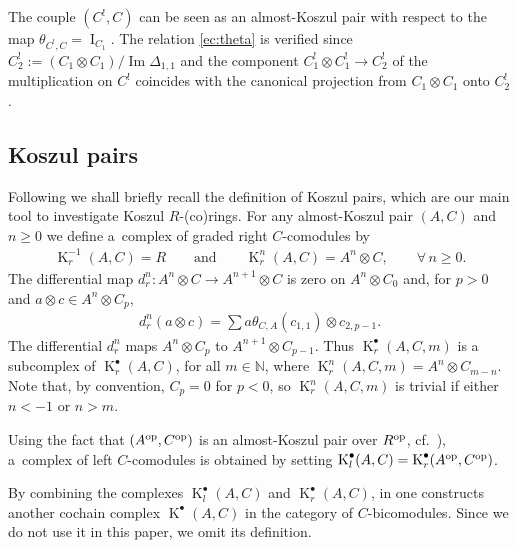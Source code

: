 \documentclass[11pt]{article}
\def\Id{\operatorname{I}}
\DeclareMathOperator{\im}{Im}
\DeclareMathOperator{\K}{K}
\newcommand\ot{\otimes}
\renewcommand{\^}[1]{\mbox{$^{\left( #1 \right)}$}}
\renewcommand{\_}[1]{\mbox{$_{\left( #1 \right)}$}}
\newcommand{\N}{{\mathbb N}}
\numberwithin{equation}{section}
\begin{document}
The couple $(C^!,C)$ can be seen as an almost-Koszul pair with respect to the map $\theta_{C^!,C}=\Id_{ C_1}$. The relation \eqref{ec:theta} is verif\/ied since $C^!_2:=(C_1\ot C_1)/\im\Delta_{1,1}$ and the component $C_1^!\ot C_1^!\to C^!_2$ of the multiplication on $C^!$ coincides with the canonical projection from $C_1\ot C_1$ onto $C^!_2$.

\subsection{Koszul pairs} \label{fa:Koszul pairs}
Following \cite{jps} we shall brief\/ly recall the def\/inition of Koszul pairs, which are our main tool to investigate Koszul $R$-(co)rings. For any almost-Koszul pair $(A,C)$ and $n\geq 0$ we def\/ine a~complex of graded right $C$-comodules by
\begin{gather*} \operatorname{K}_r^{-1}(A,C)=R \qquad \text{and} \qquad \operatorname{K}^n_r(A,C)=A^n \otimes C, \qquad \forall\, n \geq 0.\end{gather*}
The dif\/ferential map $d_{r}^{n}\colon A^{n}\otimes C\rightarrow A^{n+1}\otimes C$ is zero on $A^{n}\otimes C_{0}$ and, for $p>0$ and $a\otimes c\in A^{n}\otimes C_{p},$
\begin{gather*}
 d_{r}^{n}(a\otimes c)=\sum\limits a\theta _{C,A}(c_{1,{1}})\otimes c_{2,{p-1}}.
\end{gather*}
The dif\/ferential $d^n_r$ maps $A^{n}\ot C_{p}$ to $A^{n+1}\ot C_{p-1}$. Thus $\K^\bullet_r(A,C,m)$ is a subcomplex of $\K^\bullet_r(A,C)$, for all $m\in\N$, where $\K^n_r(A,C,m)= A^{n}\ot C_{m-n}$. Note that, by convention, $C_p=0$ for $p<0$, so $\K^n_r(A,C,m)$ is trivial if either $n<-1$ or $n>m$.

Using the fact that $(A^{\rm op},C^{\rm op})$ is an almost-Koszul pair over $R^{\rm op}$, cf.\ \cite[Remark~1.4]{jps}), a~complex of left $C$-comodules is obtained by setting $\operatorname{K}_l^\bullet(A,C)=\operatorname{K}_r^\bullet(A^{\rm op},C^{\rm op})$.

By combining the complexes $\operatorname{K}_l^\bullet(A,C)$ and $\operatorname{K}_r^\bullet(A,C)$, in \cite{jps} one constructs another cochain complex $\operatorname{K}^\bullet(A,C)$ in the category of $C$-bicomodules. Since we do not use it in this paper, we omit its def\/inition.
\end{document}
